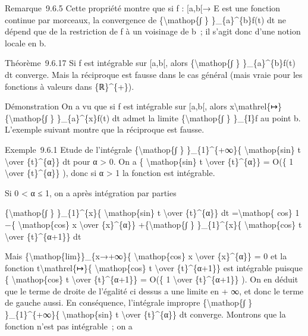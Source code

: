 \documentclass[]{article}
\begin{document}
Remarque~9.6.5 Cette propriété montre que si f : {[}a,b{[}→ E est une
fonction continue par morceaux, la convergence de
\{\textbackslash{}mathop\{∫ \} \}\_\{a\}\^{}\{b\}f(t) dt ne dépend que
de la restriction de f à un voisinage de b~; il s'agit donc d'une notion
locale en b.

Théorème~9.6.17 Si f est intégrable sur {[}a,b{[}, alors
\{\textbackslash{}mathop\{∫ \} \}\_\{a\}\^{}\{b\}f(t) dt converge. Mais
la réciproque est fausse dans le cas général (mais vraie pour les
fonctions à valeurs dans \{ℝ\}\^{}\{+\}).

Démonstration On a vu que si f est intégrable sur {[}a,b{[}, alors
x\textbackslash{}mathrel\{↦\}\{\textbackslash{}mathop\{∫ \}
\}\_\{a\}\^{}\{x\}f(t) dt admet la limite \{\textbackslash{}mathop\{∫ \}
\}\_\{I\}f au point b. L'exemple suivant montre que la réciproque est
fausse.

Exemple~9.6.1 Etude de l'intégrale \{\textbackslash{}mathop\{∫ \}
\}\_\{1\}\^{}\{+∞\}\{ \textbackslash{}mathop\{sin\} t
\textbackslash{}over \{t\}\^{}\{α\}\} dt pour α \textgreater{} 0. On a
\{ \textbackslash{}mathop\{sin\} t \textbackslash{}over \{t\}\^{}\{α\}\}
= O(\{ 1 \textbackslash{}over \{t\}\^{}\{α\}\} ), donc si α
\textgreater{} 1 la fonction est intégrable.

Si 0 \textless{} α ≤ 1, on a après intégration par parties

\{\textbackslash{}mathop\{∫ \} \}\_\{1\}\^{}\{x\}\{
\textbackslash{}mathop\{sin\} t \textbackslash{}over \{t\}\^{}\{α\}\} dt
=\textbackslash{}mathop\{ cos\} 1 −\{ \textbackslash{}mathop\{cos\} x
\textbackslash{}over \{x\}\^{}\{α\}\} +\{\textbackslash{}mathop\{∫ \}
\}\_\{1\}\^{}\{x\}\{ \textbackslash{}mathop\{cos\} t
\textbackslash{}over \{t\}\^{}\{α+1\}\} dt

Mais \{\textbackslash{}mathop\{lim\}\}\_\{x→+∞\}\{
\textbackslash{}mathop\{cos\} x \textbackslash{}over \{x\}\^{}\{α\}\} =
0 et la fonction t\textbackslash{}mathrel\{↦\}\{
\textbackslash{}mathop\{cos\} t \textbackslash{}over \{t\}\^{}\{α+1\}\}
est intégrable puisque \{ \textbackslash{}mathop\{cos\} t
\textbackslash{}over \{t\}\^{}\{α+1\}\} = O(\{ 1 \textbackslash{}over
\{t\}\^{}\{α+1\}\} ). On en déduit que le terme de droite de l'égalité
ci dessus a une limite en + ∞, et donc le terme de gauche aussi. En
conséquence, l'intégrale impropre \{\textbackslash{}mathop\{∫ \}
\}\_\{1\}\^{}\{+∞\}\{ \textbackslash{}mathop\{sin\} t
\textbackslash{}over \{t\}\^{}\{α\}\} dt converge. Montrons que la
fonction n'est pas intégrable~; on a
\end{document}
